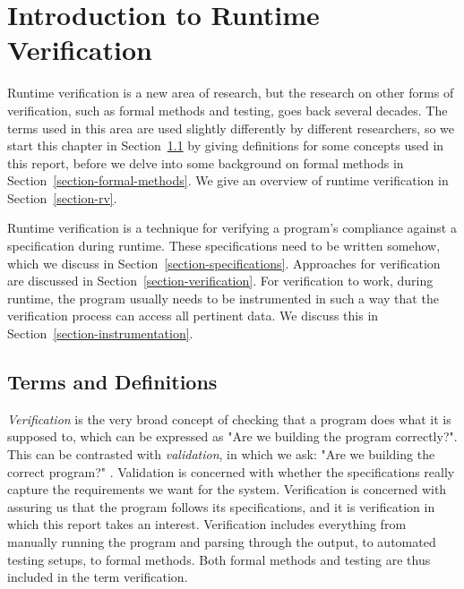 
\pagestyle{newchap}
\chapter{Introduction to Runtime Verification} \label{chapter-intro-to-rv}

Runtime verification is a new area of research, but the research on other forms
of verification, such as formal methods and testing, goes back several decades.
The terms used in this area are used slightly differently by different
researchers, so we start this chapter in
Section~\ref{section-background-definitions} by giving definitions for some
concepts used in this report, before we delve into some background on formal
methods in Section~\ref{section-formal-methods}. We give an overview of runtime
verification in Section~\ref{section-rv}.

Runtime verification is a technique for verifying a program's compliance
against a specification during runtime. These specifications need to be written
somehow, which we discuss in Section~\ref{section-specifications}. Approaches
for verification are discussed in Section~\ref{section-verification}. For
verification to work, during runtime, the program usually needs to be
instrumented in such a way that the verification process can access all
pertinent data. We discuss this in Section~\ref{section-instrumentation}.


\section{Terms and Definitions}
\label{section-background-definitions}
\label{section-definition-verification}
\label{section-system-model}

\textit{Verification} is the very broad concept of checking that a program does
what it is supposed to, which can be expressed as "Are we building the program
correctly?". This can be contrasted with \textit{validation}, in which we ask:
"Are we building the correct program?" \cite{boehm81engineeringeconomics}.
Validation is concerned with whether the specifications really capture the
requirements we want for the system. Verification is concerned with assuring us
that the program follows its specifications, and it is verification in which
this report takes an interest. Verification includes everything from manually
running the program and parsing through the output, to automated testing
setups, to formal methods. Both formal methods and testing are thus included in
the term verification.


